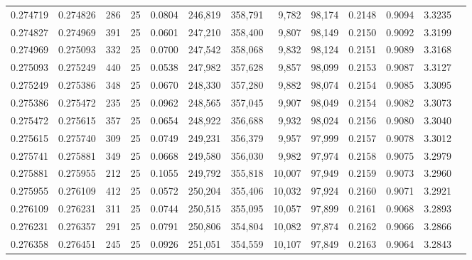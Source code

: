 \begin{tabular}{rrrrrrrrrrrrr}
0.274719 & 0.274826 &   286 &  25 &                                     0.0804 & 246,819 & 358,791 &   9,782 &  98,174 & 0.2148 & 0.9094 & 3.3235 \\
0.274827 & 0.274969 &   391 &  25 &                                     0.0601 & 247,210 & 358,400 &   9,807 &  98,149 & 0.2150 & 0.9092 & 3.3199 \\
0.274969 & 0.275093 &   332 &  25 &                                     0.0700 & 247,542 & 358,068 &   9,832 &  98,124 & 0.2151 & 0.9089 & 3.3168 \\
0.275093 & 0.275249 &   440 &  25 &                                     0.0538 & 247,982 & 357,628 &   9,857 &  98,099 & 0.2153 & 0.9087 & 3.3127 \\
0.275249 & 0.275386 &   348 &  25 &                                     0.0670 & 248,330 & 357,280 &   9,882 &  98,074 & 0.2154 & 0.9085 & 3.3095 \\
0.275386 & 0.275472 &   235 &  25 &                                     0.0962 & 248,565 & 357,045 &   9,907 &  98,049 & 0.2154 & 0.9082 & 3.3073 \\
0.275472 & 0.275615 &   357 &  25 &                                     0.0654 & 248,922 & 356,688 &   9,932 &  98,024 & 0.2156 & 0.9080 & 3.3040 \\
0.275615 & 0.275740 &   309 &  25 &                                     0.0749 & 249,231 & 356,379 &   9,957 &  97,999 & 0.2157 & 0.9078 & 3.3012 \\
0.275741 & 0.275881 &   349 &  25 &                                     0.0668 & 249,580 & 356,030 &   9,982 &  97,974 & 0.2158 & 0.9075 & 3.2979 \\
0.275881 & 0.275955 &   212 &  25 &                                     0.1055 & 249,792 & 355,818 &  10,007 &  97,949 & 0.2159 & 0.9073 & 3.2960 \\
0.275955 & 0.276109 &   412 &  25 &                                     0.0572 & 250,204 & 355,406 &  10,032 &  97,924 & 0.2160 & 0.9071 & 3.2921 \\
0.276109 & 0.276231 &   311 &  25 &                                     0.0744 & 250,515 & 355,095 &  10,057 &  97,899 & 0.2161 & 0.9068 & 3.2893 \\
0.276231 & 0.276357 &   291 &  25 &                                     0.0791 & 250,806 & 354,804 &  10,082 &  97,874 & 0.2162 & 0.9066 & 3.2866 \\
0.276358 & 0.276451 &   245 &  25 &                                     0.0926 & 251,051 & 354,559 &  10,107 &  97,849 & 0.2163 & 0.9064 & 3.2843 \\

\end{tabular}
